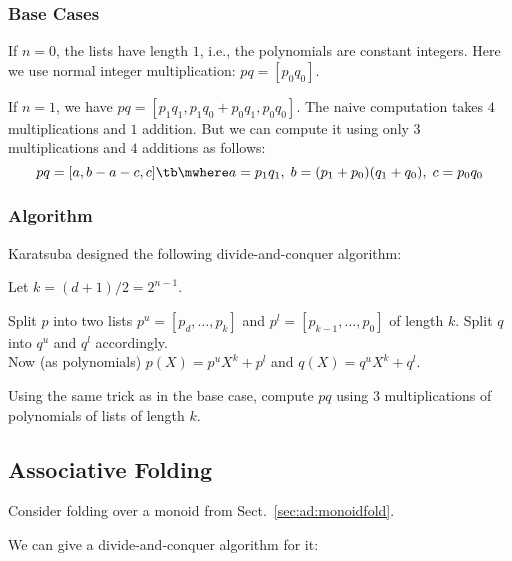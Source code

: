 \subsubsection{Base Cases}

If $n=0$, the lists have length $1$, i.e., the polynomials are constant integers.
Here we use normal integer multiplication: $pq=[p_0 q_0]$.

If $n=1$, we have $pq=[p_1 q_1, p_1 q_0 + p_0 q_1, p_0 q_0]$.
The naive computation takes $4$ multiplications and $1$ addition.
But we can compute it using only $3$ multiplications and $4$ additions as follows:
\[pq=[a, b-a-c, c] \tb\mwhere a=p_1q_1, \;b=(p_1+p_0)(q_1+q_0),\;c=p_0 q_0\]

\subsubsection{Algorithm}

Karatsuba designed the following divide-and-conquer algorithm:
\begin{compactenum}
 \item Let $k=(d+1)/2=2^{n-1}$.
 \item Split $p$ into two lists $p^u=[p_d,\ldots,p_k]$ and $p^l=[p_{k-1},\ldots,p_0]$ of length $k$. Split $q$ into $q^u$ and $q^l$ accordingly.\\
 Now (as polynomials) $p(X)=p^u X^k+p^l$ and $q(X)=q^u X^k+q^l$.
 \item Using the same trick as in the base case, compute $pq$ using $3$ multiplications of polynomials of lists of length $k$.
\end{compactenum}


\subsection{Associative Folding}\label{sec:ad:monoidfold:divide}

Consider folding over a monoid from Sect.~\ref{sec:ad:monoidfold}.

We can give a divide-and-conquer algorithm for it:

\begin{acode}
\end{acode}

